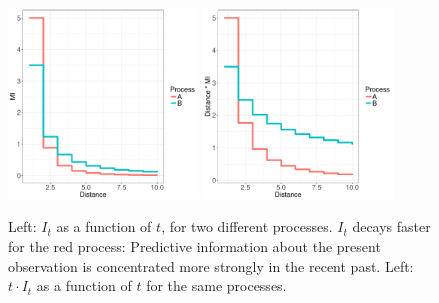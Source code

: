\begin{figure}
\includegraphics[width=0.45\textwidth]{figures/decay.pdf}
\includegraphics[width=0.45\textwidth]{figures/memory.pdf}
%
	\caption{Left: $I_t$ as a function of $t$, for two different processes. $I_t$ decays faster for the red process: Predictive information about the present observation is concentrated more strongly in the recent past. Left: $t \cdot I_t$ as a function of $t$ for the same processes. }\label{fig:basic}
\end{figure}



